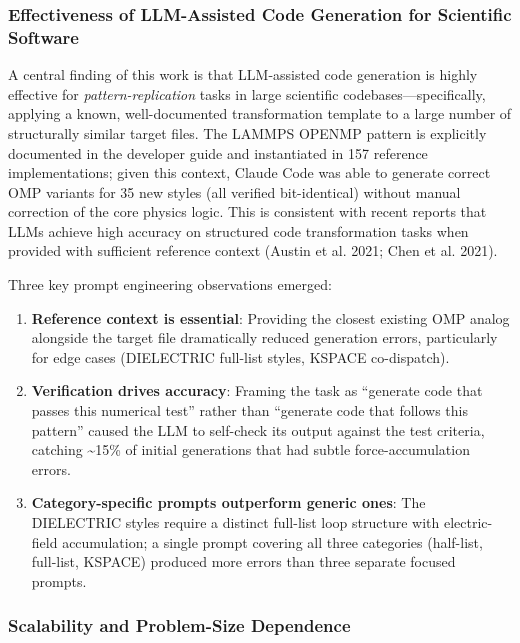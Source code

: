 \documentclass[
  11pt,
]{article}
\begin{document}
\subsubsection{Effectiveness of LLM-Assisted Code Generation for
Scientific
Software}\label{effectiveness-of-llm-assisted-code-generation-for-scientific-software}

A central finding of this work is that LLM-assisted code generation is
highly effective for \emph{pattern-replication} tasks in large
scientific codebases---specifically, applying a known, well-documented
transformation template to a large number of structurally similar target
files. The LAMMPS OPENMP pattern is explicitly documented in the
developer guide and instantiated in 157 reference implementations; given
this context, Claude Code was able to generate correct OMP variants for
35 new styles (all verified bit-identical) without manual correction of
the core physics logic. This is consistent with recent reports that LLMs
achieve high accuracy on structured code transformation tasks when
provided with sufficient reference context ({Austin et al.} 2021; {Chen
et al.} 2021).

Three key prompt engineering observations emerged:

\begin{enumerate}
\def\labelenumi{\arabic{enumi}.}
\item
  \textbf{Reference context is essential}: Providing the closest
  existing OMP analog alongside the target file dramatically reduced
  generation errors, particularly for edge cases (DIELECTRIC full-list
  styles, KSPACE co-dispatch).
\item
  \textbf{Verification drives accuracy}: Framing the task as ``generate
  code that passes this numerical test'' rather than ``generate code
  that follows this pattern'' caused the LLM to self-check its output
  against the test criteria, catching \textasciitilde15\% of initial
  generations that had subtle force-accumulation errors.
\item
  \textbf{Category-specific prompts outperform generic ones}: The
  DIELECTRIC styles require a distinct full-list loop structure with
  electric-field accumulation; a single prompt covering all three
  categories (half-list, full-list, KSPACE) produced more errors than
  three separate focused prompts.
\end{enumerate}

\subsubsection{Scalability and Problem-Size
Dependence}\label{scalability-and-problem-size-dependence}
\end{document}
